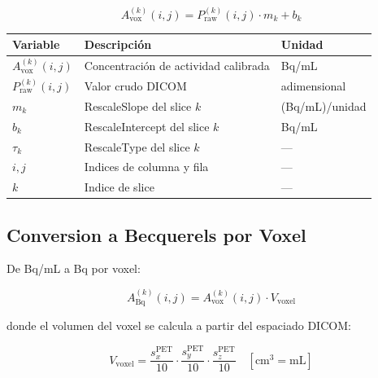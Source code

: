 \documentclass[12pt,a4paper]{article}
\begin{document}
\begin{equation}\label{eq:calibracion}
    A_{\text{vox}}^{(k)}(i,j) = P_{\text{raw}}^{(k)}(i,j) \cdot m_k + b_k
\end{equation}

\begin{table}[H]
\centering
\begin{tabular}{lll}
\toprule
\textbf{Variable} & \textbf{Descripción} & \textbf{Unidad} \\
\midrule
$A_{\text{vox}}^{(k)}(i,j)$ & Concentración de actividad calibrada & Bq/mL \\
$P_{\text{raw}}^{(k)}(i,j)$ & Valor crudo DICOM & adimensional \\
$m_k$ & RescaleSlope del slice $k$ & (Bq/mL)/unidad \\
$b_k$ & RescaleIntercept del slice $k$ & Bq/mL \\
$\tau_k$ & RescaleType del slice $k$ & --- \\
$i, j$ & Indices de columna y fila & --- \\
$k$ & Indice de slice & --- \\
\bottomrule
\end{tabular}
\end{table}

\subsection{Conversion a Becquerels por Voxel}

De Bq/mL a Bq por voxel:

\begin{equation}\label{eq:bq_por_voxel}
    A_{\text{Bq}}^{(k)}(i,j) = A_{\text{vox}}^{(k)}(i,j) \cdot V_{\text{voxel}}
\end{equation}

donde el volumen del voxel se calcula a partir del espaciado DICOM:

\begin{equation}\label{eq:vol_voxel}
    V_{\text{voxel}} = \frac{s_x^{\text{PET}}}{10} \cdot
    \frac{s_y^{\text{PET}}}{10} \cdot
    \frac{s_z^{\text{PET}}}{10} \quad [\text{cm}^3 = \text{mL}]
\end{equation}
\end{document}
